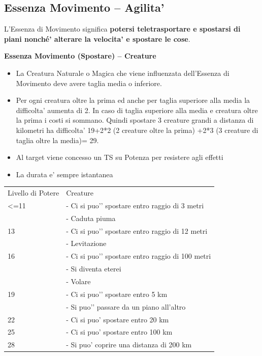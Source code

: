 \documentclass[a4paper,11pt,twoside,openany]{dndbook}
\begin{document}
\pagebreak

\subsection{Essenza Movimento -- Agilita'}

\label{essenza-movimento---agilita}

L'Essenza di Movimento significa \textbf{potersi teletrasportare e spostarsi di piani nonché' alterare la velocita' e spostare le cose}.

\textbf{Essenza Movimento (Spostare) -- Creature}

\begin{itemize}
\item 
La Creatura Naturale o Magica che viene influenzata dell'Essenza di Movimento deve avere taglia media o inferiore. 
\item 
Per ogni creatura oltre la prima ed anche per taglia superiore alla media la difficolta' aumenta di 2. In caso di taglia superiore alla media e creatura oltre la prima i costi si sommano. Quindi spostare 3 creature grandi a distanza di kilometri ha difficolta' 19+2{*}2 (2 creature oltre la prima) +2{*}3 (3 creature di taglia oltre la media)= 29. 
\item 
Al target viene concesso un TS su Potenza per resistere agli effetti 
\item 
La durata e' sempre istantanea 
\end{itemize}

\bigskip

\begin{tabular}[c]{@{}ll@{}}
\toprule 
Livello di Potere & Creature\tabularnewline
<=11 & - Ci si puo'’ spostare entro raggio di 3 metri\\
&- Caduta piuma\\
13& - Ci si puo'’ spostare entro raggio di 12 metri\\
&- Levitazione\\
16& - Ci si puo'’ spostare entro raggio di 100 metri\\
&- Si diventa eterei\\
&- Volare\\
19& - Ci si puo'’ spostare entro 5 km\\
&- Si puo'’ passare da un piano all’altro\\
22 & - Ci si puo' spostare entro 20 km\tabularnewline
25 & - Ci si puo' spostare entro 100 km\tabularnewline
28 & - Si puo' coprire una distanza di 200 km\tabularnewline
\bottomrule
\end{tabular}
\end{document}

